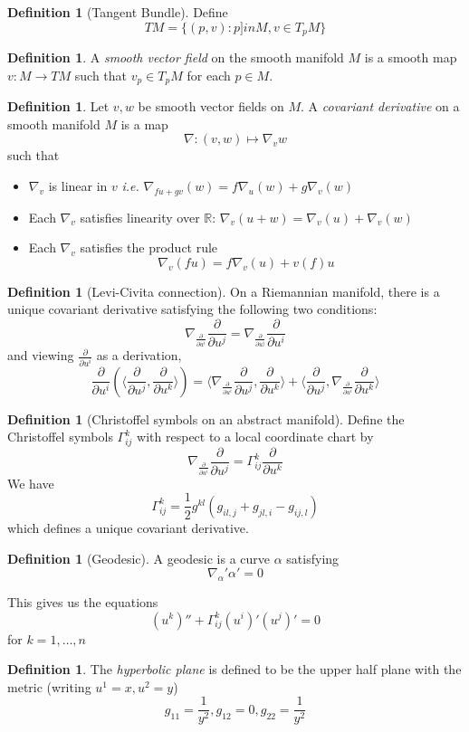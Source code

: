 \documentclass[10pt, oneside, reqno]{amsart}
\newcommand{\deriv}[1]{\frac{\partial}{\partial u^{#1}}}
\newcommand{\christ}[3]{\ensuremath{\Gamma^{#1}_{#2#3}}}
\newcommand{\R}{\mathbb{R}}
\theoremstyle{plain}%
\theoremstyle{definition}
\newtheorem{defn}[thm]{Definition}
\theoremstyle{remark}
\begin{document}
\begin{defn}[Tangent Bundle]
Define \[
	TM = \{ (p,v): p ]in M, v \in T_p M \}
\]
\end{defn}

\begin{defn}
	A \emph{smooth vector field} on the smooth manifold $M$ is a smooth map $v : M \rightarrow TM$ such that $v_p \in T_pM$ for each $p \in M$.
\end{defn}

\begin{defn}
	Let $v,w$ be smooth vector fields on $M$.  A \emph{covariant derivative} on a smooth manifold $M$ is a map \[
		\nabla : (v,w) \mapsto \nabla_v w
 	\] 
such that 
\begin{itemize}


	\item $\nabla_v$ is linear in $v$ \emph{i.e.} $\nabla_{fu + gv}(w) = f \nabla_u(w) + g \nabla_v(w)$


	\item Each $\nabla_v$ satisfies linearity over $\R$: $\nabla_v(u +w) = \nabla_v(u) + \nabla_v(w)$


	\item Each $\nabla_v$ satisfies the product rule \[
 	\nabla_v (fu) = f \nabla_v(u) + v(f) u
 \]

\end{itemize}
\end{defn}

\begin{defn}[Levi-Civita connection]
	On a Riemannian manifold, there is a unique covariant derivative satisfying the following two conditions:
	\[
		\nabla_{\frac{\partial}{\partial u^i}} \frac{\partial}{\partial u^j} = \nabla_{\frac{\partial}{\partial u^j}} \frac{\partial}{\partial u^i} 
	\]
	and viewing $\frac{\partial}{\partial u^i}$ as a derivation,\[
		\deriv{i} (\langle \deriv{j},\deriv{k}\rangle) = \langle \nabla_{\deriv{i}} \deriv{j},\deriv{k}\rangle + \langle \deriv{j},\nabla_{\deriv{i}} \deriv{k} \rangle
	\]
	
\end{defn}

\begin{defn}[Christoffel symbols on an abstract manifold]
	Define the Christoffel symbols \christ{k}{i}{j} with respect to a local coordinate chart by \[
		\nabla_\deriv{i} \deriv{j} = \christ{k}{i}{j} \deriv{k}
	\]
	We have \[
		\christ{k}{i}{j} = \frac{1}{2}g^{kl}\left( g_{il,j} + g_{jl,i} - g_{ij,l} \right)
		\] which defines a unique covariant derivative.
\end{defn}

\begin{defn}[Geodesic]
	A geodesic is a curve $\alpha$ satisfying 
	\[ \nabla_\alpha' \alpha' = 0 \]
	
	This gives us the equations \[
		(u^k)'' + \christ{k}{i}{j}(u^i)'(u^j)' = 0
	\] for $k = 1,\dots,n$
\end{defn}


\begin{defn}
	The \emph{hyperbolic plane} is defined to be the upper half plane with the metric (writing $u^1 = x, u^2 = y$) \[
		g_{11} = \frac{1}{y^2}, g_{12} = 0, g_{22} = \frac{1}{y^2}
 	\]
\end{defn}
\end{document}
